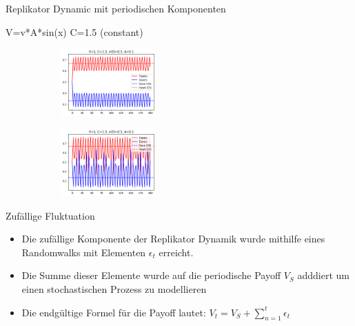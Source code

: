 \documentclass{beamer}
\begin{document}
\begin{frame}{Replikator Dynamic mit periodischen Komponenten}
    \begin{block}{V=v*A*sin(x) C=1.5 (constant)}
    \begin{itemize}
        \begin{figure}[htp]
            \centering
            \begin{subfigure}
                \centering
                \includegraphics[width=0.4\textwidth]{Figs/HDSeasonal.png}
                \label{fig:HDSeasonal}
            \end{subfigure}
            \hfill
            \begin{subfigure}
                \centering
                \includegraphics[width=0.4\textwidth]{Figs/HDseasonal2.png}
                \label{fig:HDSeasonal2}
            \end{subfigure}
            \hfill
        \end{figure}
    \end{itemize}
    \end{block} 
    
\end{frame}


\begin{frame}{Zufällige Fluktuation}
    \begin{block}{}
    \begin{itemize}
        \item Die zufällige Komponente der Replikator Dynamik wurde mithilfe eines Randomwalks mit  Elementen $\epsilon_t$ erreicht.
        \item Die Summe dieser Elemente wurde auf die periodische Payoff $V_S$ adddiert um einen stochastischen Prozess zu modellieren
        \item Die endgültige Formel für die Payoff lautet: $V_t = V_S + \sum_{n=1}^{t} \epsilon_t$
    \end{itemize}
    \end{block} 
    
\end{frame}
\end{document}
